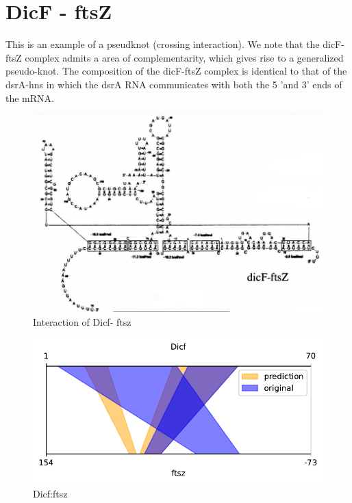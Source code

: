 \documentclass[twoside,a4paper]{report}
\begin{document}
\clearpage
	
%	
	
	\section{DicF - ftsZ }
	
	This is an example of a pseudknot (crossing interaction). We note that the dicF-ftsZ complex admits a area of complementarity, which gives rise to a generalized pseudo-knot. The composition of the dicF-ftsZ complex is identical to that of the dsrA-hns in which the dsrA RNA communicates with both the 5 'and 3' ends of the mRNA.\\   
	
		\begin{figure}[h!tb]
		\includegraphics[width=1.0\linewidth]{dicf}
		\centering
		\caption{ Interaction of Dicf- ftsz } 
		\label{fig:dicf}
	\end{figure}

\begin{figure}[h!tb]
	\centering
	\includegraphics[width=.4\linewidth]{rricomparison3}
	\caption{Dicf:ftsz}
	\label{fig:rricomparison3}
\end{figure}
\end{document}
